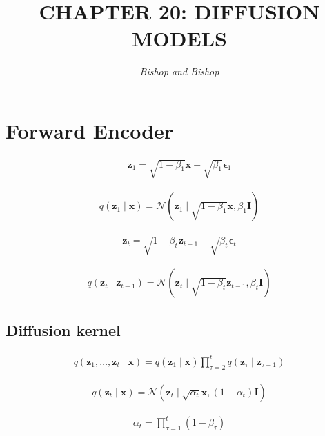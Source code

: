 \documentclass{article}
\title{\LARGE\scshape\MakeUppercase{Chapter 20: Diffusion Models}}
\author{\textit{Bishop and Bishop}}
\date{}
\begin{document}
\maketitle

\section{Forward Encoder}

\begin{align*}
\mathbf{z}_{1}=\sqrt{1-\beta_{1}} \mathbf{x}+\sqrt{\beta_{1}} \boldsymbol{\epsilon}_{1} 
\tag{20.1}
\end{align*}

\begin{align*}
q\left(\mathbf{z}_{1} \mid \mathbf{x}\right)=\mathcal{N}\left(\mathbf{z}_{1} \mid \sqrt{1-\beta_{1}} \mathbf{x}, \beta_{1} \mathbf{I}\right)
\tag{20.2}
\end{align*}

\begin{align*}
\mathbf{z}_{t}=\sqrt{1-\beta_{t}} \mathbf{z}_{t-1}+\sqrt{\beta_{t}} \boldsymbol{\epsilon}_{t}
\tag{20.3}
\end{align*}

\begin{align*}
q\left(\mathbf{z}_{t} \mid \mathbf{z}_{t-1}\right)=\mathcal{N}\left(\mathbf{z}_{t} \mid \sqrt{1-\beta_{t}} \mathbf{z}_{t-1}, \beta_{t} \mathbf{I}\right)
\tag{20.4}
\end{align*}

\subsection{Diffusion kernel}

\begin{align*}
q\left(\mathbf{z}_{1}, \ldots, \mathbf{z}_{t} \mid \mathbf{x}\right)=q\left(\mathbf{z}_{1} \mid \mathbf{x}\right) \prod_{\tau=2}^{t} q\left(\mathbf{z}_{\tau} \mid \mathbf{z}_{\tau-1}\right)
\tag{20.5}
\end{align*}

\begin{align*}
q\left(\mathbf{z}_{t} \mid \mathbf{x}\right)=\mathcal{N}\left(\mathbf{z}_{t} \mid \sqrt{\alpha_{t}} \mathbf{x},\left(1-\alpha_{t}\right) \mathbf{I}\right)
\tag{20.6}
\end{align*}

\begin{align*}
\alpha_{t}=\prod_{\tau=1}^{t}\left(1-\beta_{\tau}\right)
\tag{20.7}
\end{align*}
\end{document}
